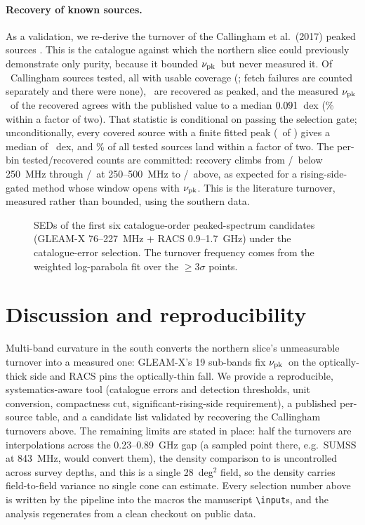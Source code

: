 \documentclass[twocolumn]{aastex631}
\newcommand{\code}[1]{\texttt{#1}}
\newcommand{\nupk}{\ensuremath{\nu_{\rm pk}}}
\begin{document}
\paragraph{Recovery of known sources.} As a validation, we re-derive the turnover of the Callingham
et al.\ (2017) peaked sources \citep{callingham2017}. This is the catalogue against which the northern
slice could previously demonstrate only purity, because it bounded \nupk\ but never measured it. Of
\soRealCallTried\ Callingham sources tested, all with usable coverage
(\soRealCallCovered; fetch failures are counted separately and there were none),
\soRealCallRecovered\ are recovered as peaked, and the measured \nupk\ of the recovered agrees
with the published value to a median $0.091$~dex (\soRealCallWithin\% within a factor
of two). That statistic is conditional on passing the selection gate; unconditionally, every
covered source with a finite fitted peak (\soRealCallNuncond\ of \soRealCallTried) gives a median
of \soRealCallDlogUncond~dex, and \soRealCallWithinTwoOfTested\% of all tested sources
land within a factor of two. The per-bin tested/recovered counts are committed: recovery climbs from
\soRealCallBinLowRecovered/\soRealCallBinLowTested\ below 250~MHz through
\soRealCallBinMidRecovered/\soRealCallBinMidTested\ at 250--500~MHz to
\soRealCallBinHiRecovered/\soRealCallBinHiTested\ above, as expected for a
rising-side-gated method whose window opens with \nupk. This is the literature turnover, measured
rather than bounded, using the southern data.

\begin{figure}
\caption{SEDs of the first six catalogue-order peaked-spectrum candidates (GLEAM-X 76--227~MHz
$+$ RACS 0.9--1.7~GHz) under the catalogue-error selection. The turnover frequency comes from the
weighted log-parabola fit over the $\ge3\sigma$ points.}
\label{fig:seds}
\end{figure}

\section{Discussion and reproducibility}
Multi-band curvature in the south converts the northern slice's unmeasurable turnover into a measured
one: GLEAM-X's 19 sub-bands fix \nupk\ on the optically-thick side and RACS pins the optically-thin
fall. We provide a reproducible, systematics-aware tool (catalogue errors and detection
thresholds, unit conversion, compactness cut, significant-rising-side requirement), a published
per-source table, and a candidate list validated by recovering the Callingham
\citep{callingham2017} turnovers above. The remaining limits are stated in place: half the
turnovers are interpolations across the 0.23--0.89~GHz gap (a sampled point there, e.g.\ SUMSS
at 843~MHz, would convert them), the density comparison to \citet{kerrison2025} is uncontrolled
across survey depths, and this is a single 28~deg$^2$ field, so the density carries
field-to-field variance no single cone can estimate. Every selection number above is written by
the pipeline into the macros the manuscript \code{\textbackslash input}s, and the analysis
regenerates from a clean checkout on public data.
\end{document}
